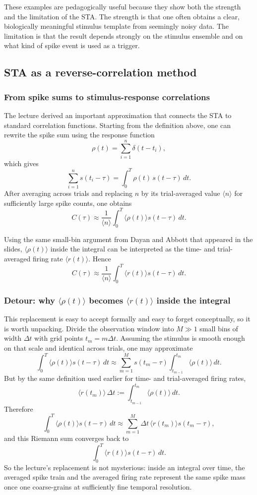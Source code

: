 \documentclass[11pt]{article}
\begin{document}
These examples are pedagogically useful because they show both the strength and the limitation of the STA. The strength is that one often obtains a clear, biologically meaningful stimulus template from seemingly noisy data. The limitation is that the result depends strongly on the stimulus ensemble and on what kind of spike event is used as a trigger.

\subsection{STA as a reverse-correlation method}

\subsubsection{From spike sums to stimulus-response correlations}

The lecture derived an important approximation that connects the STA to standard correlation functions. Starting from the definition above, one can rewrite the spike sum using the response function
\[
\rho(t)=\sum_{i=1}^{n}\delta(t-t_i),
\]
which gives
\[
\sum_{i=1}^{n} s(t_i-\tau) = \int_0^T \rho(t)\,s(t-\tau)\,dt.
\]
After averaging across trials and replacing $n$ by its trial-averaged value $\langle n \rangle$ for sufficiently large spike counts, one obtains
\[
C(\tau) \approx \frac{1}{\langle n \rangle}\int_0^T \langle \rho(t)\rangle s(t-\tau)\,dt.
\]

Using the same small-bin argument from Dayan and Abbott that appeared in the slides, $\langle \rho(t)\rangle$ inside the integral can be interpreted as the time- and trial-averaged firing rate $\langle r(t)\rangle$. Hence
\[
C(\tau) \approx \frac{1}{\langle n \rangle}\int_0^T \langle r(t)\rangle s(t-\tau)\,dt.
\]

\subsubsection{Detour: why $\langle \rho(t)\rangle$ becomes $\langle r(t)\rangle$ inside the integral}

This replacement is easy to accept formally and easy to forget conceptually, so it is worth unpacking. Divide the observation window into $M\gg 1$ small bins of width $\Delta t$ with grid points $t_m=m\Delta t$. Assuming the stimulus is smooth enough on that scale and identical across trials, one may approximate
\[
\int_0^T \langle \rho(t)\rangle s(t-\tau)\,dt
\approx
\sum_{m=1}^{M} s(t_m-\tau)
\int_{t_{m-1}}^{t_m} \langle \rho(t)\rangle\,dt.
\]
But by the same definition used earlier for time- and trial-averaged firing rates,
\[
\langle r(t_m)\rangle\,\Delta t
:=
\int_{t_{m-1}}^{t_m} \langle \rho(t)\rangle\,dt.
\]
Therefore
\[
\int_0^T \langle \rho(t)\rangle s(t-\tau)\,dt
\approx
\sum_{m=1}^{M} \Delta t\,\langle r(t_m)\rangle s(t_m-\tau),
\]
and this Riemann sum converges back to
\[
\int_0^T \langle r(t)\rangle s(t-\tau)\,dt.
\]
So the lecture's replacement is not mysterious: inside an integral over time, the averaged spike train and the averaged firing rate represent the same spike mass once one coarse-grains at sufficiently fine temporal resolution.
\end{document}
